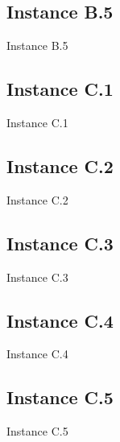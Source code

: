 \subsection{Instance B.5}
\begin{table}[H]
\centering

\caption{Instance B.5}
\label{tblscpB5}
\end{table}
\newpage

\subsection{Instance C.1}
\begin{table}[H]
\centering

\caption{Instance C.1}
\label{tblscpC1}
\end{table}
\newpage
\subsection{Instance C.2}
\begin{table}[H]
\centering

\caption{Instance C.2}
\label{tblscpC2}
\end{table}
\newpage

\subsection{Instance C.3}
\begin{table}[H]
\centering

\caption{Instance C.3}
\label{tblscpC3}
\end{table}
\newpage

\subsection{Instance C.4}
\begin{table}[H]
\centering

\caption{Instance C.4}
\label{tblscpC4}
\end{table}
\newpage

\subsection{Instance C.5}
\begin{table}[H]
\centering

\caption{Instance C.5}
\label{tblscpC5}
\end{table}
\newpage

